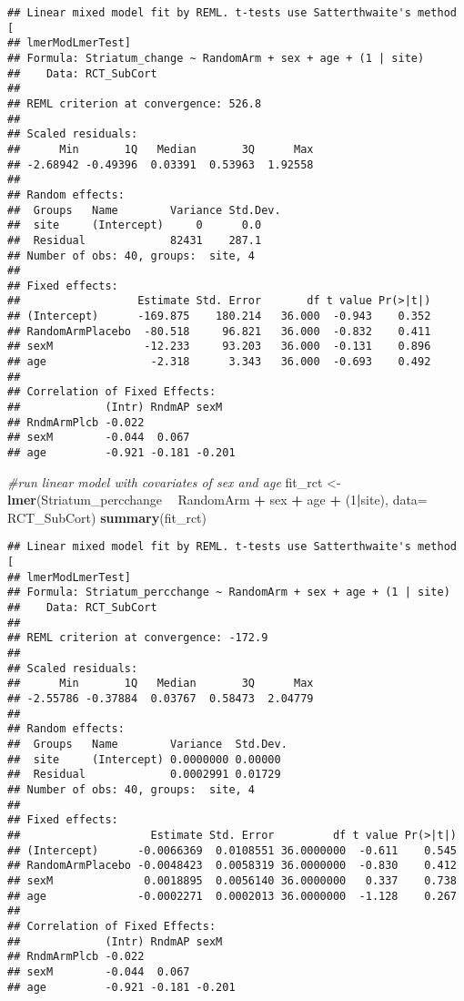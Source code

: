 \documentclass[]{article}
\newenvironment{Shaded}{\begin{snugshade}}{\end{snugshade}}
\newcommand{\KeywordTok}[1]{\textcolor[rgb]{0.13,0.29,0.53}{\textbf{#1}}}
\newcommand{\DataTypeTok}[1]{\textcolor[rgb]{0.13,0.29,0.53}{#1}}
\newcommand{\DecValTok}[1]{\textcolor[rgb]{0.00,0.00,0.81}{#1}}
\newcommand{\StringTok}[1]{\textcolor[rgb]{0.31,0.60,0.02}{#1}}
\newcommand{\CommentTok}[1]{\textcolor[rgb]{0.56,0.35,0.01}{\textit{#1}}}
\newcommand{\OperatorTok}[1]{\textcolor[rgb]{0.81,0.36,0.00}{\textbf{#1}}}
\newcommand{\NormalTok}[1]{#1}
\theoremstyle{definition}
\theoremstyle{definition}
\theoremstyle{definition}
\theoremstyle{remark}
\begin{document}
\begin{verbatim}
## Linear mixed model fit by REML. t-tests use Satterthwaite's method [
## lmerModLmerTest]
## Formula: Striatum_change ~ RandomArm + sex + age + (1 | site)
##    Data: RCT_SubCort
## 
## REML criterion at convergence: 526.8
## 
## Scaled residuals: 
##      Min       1Q   Median       3Q      Max 
## -2.68942 -0.49396  0.03391  0.53963  1.92558 
## 
## Random effects:
##  Groups   Name        Variance Std.Dev.
##  site     (Intercept)     0      0.0   
##  Residual             82431    287.1   
## Number of obs: 40, groups:  site, 4
## 
## Fixed effects:
##                  Estimate Std. Error       df t value Pr(>|t|)
## (Intercept)      -169.875    180.214   36.000  -0.943    0.352
## RandomArmPlacebo  -80.518     96.821   36.000  -0.832    0.411
## sexM              -12.233     93.203   36.000  -0.131    0.896
## age                -2.318      3.343   36.000  -0.693    0.492
## 
## Correlation of Fixed Effects:
##             (Intr) RndmAP sexM  
## RndmArmPlcb -0.022              
## sexM        -0.044  0.067       
## age         -0.921 -0.181 -0.201
\end{verbatim}

\begin{Shaded}
\begin{Highlighting}[]
\CommentTok{#run linear model with covariates of sex and age}
\NormalTok{  fit_rct <-}\StringTok{ }\KeywordTok{lmer}\NormalTok{(Striatum_percchange }\OperatorTok{~}\StringTok{ }\NormalTok{RandomArm }\OperatorTok{+}\StringTok{ }\NormalTok{sex }\OperatorTok{+}\StringTok{ }\NormalTok{age }\OperatorTok{+}\StringTok{ }\NormalTok{(}\DecValTok{1}\OperatorTok{|}\NormalTok{site), }\DataTypeTok{data=}\NormalTok{ RCT_SubCort)}
  \KeywordTok{summary}\NormalTok{(fit_rct)}
\end{Highlighting}
\end{Shaded}

\begin{verbatim}
## Linear mixed model fit by REML. t-tests use Satterthwaite's method [
## lmerModLmerTest]
## Formula: Striatum_percchange ~ RandomArm + sex + age + (1 | site)
##    Data: RCT_SubCort
## 
## REML criterion at convergence: -172.9
## 
## Scaled residuals: 
##      Min       1Q   Median       3Q      Max 
## -2.55786 -0.37884  0.03767  0.58473  2.04779 
## 
## Random effects:
##  Groups   Name        Variance  Std.Dev.
##  site     (Intercept) 0.0000000 0.00000 
##  Residual             0.0002991 0.01729 
## Number of obs: 40, groups:  site, 4
## 
## Fixed effects:
##                    Estimate Std. Error         df t value Pr(>|t|)
## (Intercept)      -0.0066369  0.0108551 36.0000000  -0.611    0.545
## RandomArmPlacebo -0.0048423  0.0058319 36.0000000  -0.830    0.412
## sexM              0.0018895  0.0056140 36.0000000   0.337    0.738
## age              -0.0002271  0.0002013 36.0000000  -1.128    0.267
## 
## Correlation of Fixed Effects:
##             (Intr) RndmAP sexM  
## RndmArmPlcb -0.022              
## sexM        -0.044  0.067       
## age         -0.921 -0.181 -0.201
\end{verbatim}
\end{document}
